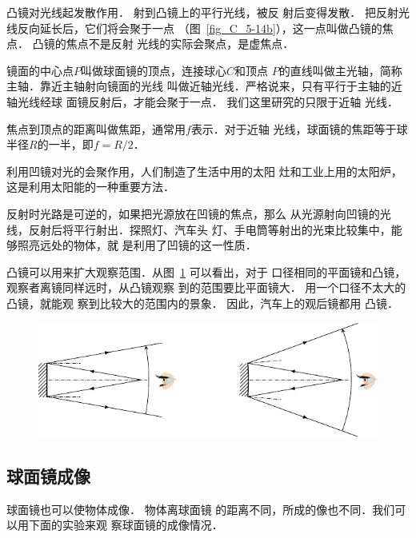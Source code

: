 凸镜对光线起发散作用．
射到凸镜上的平行光线，被反
射后变得发散．
把反射光线反向延长后，它们将会聚于一点
（图~\ref{fig_C_5-14b}），这一点叫做凸镜的焦点．
凸镜的焦点不是反射
光线的实际会聚点，是虚焦点．

镜面的中心点$P$叫做球面镜的顶点，连接球心$C$和顶点
$P$的直线叫做主光轴，简称主轴．靠近主轴射向镜面的光线
叫做近轴光线．严格说来，只有平行于主轴的近轴光线经球
面镜反射后，才能会聚于一点．
我们这里研究的只限于近轴
光线．

焦点到顶点的距离叫做焦距，通常用$f$表示．对于近轴
光线，球面镜的焦距等于球半径$R$的一半，即$f=R/2$．

利用凹镜对光的会聚作用，人们制造了生活中用的太阳
灶和工业上用的太阳炉，这是利用太阳能的一种重要方法．

反射时光路是可逆的，如果把光源放在凹镜的焦点，那么
从光源射向凹镜的光线，反射后将平行射出．探照灯、汽车头
灯、手电筒等射出的光束比较集中，能够照亮远处的物体，就
是利用了凹镜的这一性质．

凸镜可以用来扩大观察范围．从图~\ref{fig_C_5-15} 可以看出，对于
口径相同的平面镜和凸镜，观察者离镜同样远时，从凸镜观察
到的范围要比平面镜大．
用一个口径不太大的凸镜，就能观
察到比较大的范围内的景象．
因此，汽车上的观后镜都用
凸镜．

\begin{figure}[htbp]
    \centering
    \includegraphics{fig/C/5-15.pdf}
    \caption{}\label{fig_C_5-15}
\end{figure}

\subsection{球面镜成像}
球面镜也可以使物体成像．
物体离球面镜
的距离不同，所成的像也不同．我们可以用下面的实验来观
察球面镜的成像情况．



